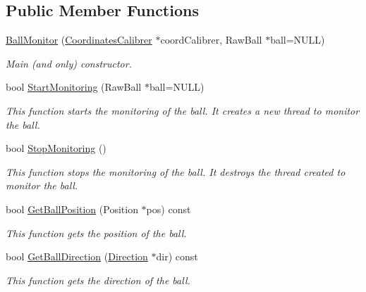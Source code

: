 \subsection*{Public Member Functions}
\begin{DoxyCompactItemize}
\item 
\hyperlink{classBallMonitor_a176a257973eefa572b6972aa6b5a605d}{BallMonitor} (\hyperlink{classCoordinatesCalibrer}{CoordinatesCalibrer} $\ast$coordCalibrer, RawBall $\ast$ball=NULL)
\begin{DoxyCompactList}\small\item\em Main (and only) constructor. \item\end{DoxyCompactList}\item 
bool \hyperlink{classBallMonitor_a4d2b3aa764f5d4f4d5f58b7530565f90}{StartMonitoring} (RawBall $\ast$ball=NULL)
\begin{DoxyCompactList}\small\item\em This function starts the monitoring of the ball. It creates a new thread to monitor the ball. \item\end{DoxyCompactList}\item 
bool \hyperlink{classBallMonitor_af71db12abeb1f10f7be58eb7591910a3}{StopMonitoring} ()
\begin{DoxyCompactList}\small\item\em This function stops the monitoring of the ball. It destroys the thread created to monitor the ball. \item\end{DoxyCompactList}\item 
bool \hyperlink{classBallMonitor_aab81815271c442087c15bc8f6843d092}{GetBallPosition} (Position $\ast$pos) const 
\begin{DoxyCompactList}\small\item\em This function gets the position of the ball. \item\end{DoxyCompactList}\item 
bool \hyperlink{classBallMonitor_a3cd2fe1ed297c468634fbb390ca088bd}{GetBallDirection} (\hyperlink{structBallMonitor_1_1Direction}{Direction} $\ast$dir) const 
\begin{DoxyCompactList}\small\item\em This function gets the direction of the ball. \item\end{DoxyCompactList}\item 

\end{DoxyCompactItemize}

